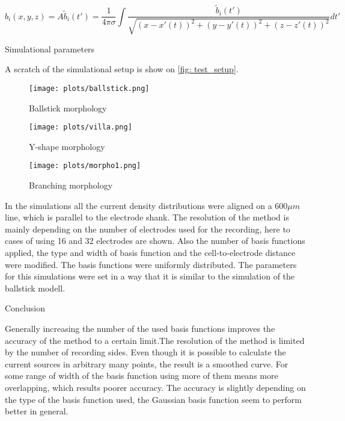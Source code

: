\documentclass[12pt,a4paper]{article}
\begin{document}
\begin{equation}
b_i (x,y,z)= A \tilde{b}_i (t')= \frac{1}{4 \pi \sigma} \int 
\frac{ \tilde{b}_i (t')}{\sqrt{(x-x'(t))^2+(y-y'(t))^2+(z-z'(t))^2}} dt'
\end{equation}



Simulational parameters


A scratch of the simulational setup is show on \ref{fig: test_setup}.


\begin{figure}[h]
\centering
\begin{minipage}[b]{0.3\linewidth}
\texttt{[image: plots/ballstick.png]}
\caption{Ballstick morphology}
\label{fig: test_setup1}
\end{minipage}
\quad
\begin{minipage}[b]{0.3\linewidth}
\texttt{[image: plots/villa.png]}
\caption{Y-shape morphology}
\label{fig: test_setup2}
\end{minipage}
\quad
\begin{minipage}[b]{0.3\linewidth}
\texttt{[image: plots/morpho1.png]}
\caption{Branching morphology}
\label{fig: test_setup2}
\end{minipage}



\end{figure}


In the simulations all the current density distributions were aligned on a $600 \mu m$line, which is parallel to the electrode shank. The resolution of the method is mainly depending on the number of electrodes used for the recording, here to cases of using 16 and 32 electrodes are shown. Also the number of basis functions applied, the type and width of basis function and the cell-to-electrode distance were modified. The basis functions were uniformly distributed. The parameters for this simulations were set in a way that it is similar to the simulation of the ballstick modell.

Conclusion

Generally increasing the number of the used basis functions improves the accuracy of the method to a certain limit.The resolution of the method is limited by the number of recording sides. Even though it is possible to calculate the current sources in arbitrary many points, the result is a smoothed curve. For some range of width of the basis function using more of them means more overlapping, which results poorer accuracy. The accuracy is slightly depending on the type of the basis function used, the Gaussian basis function seem to perform better in general.
\end{document}
